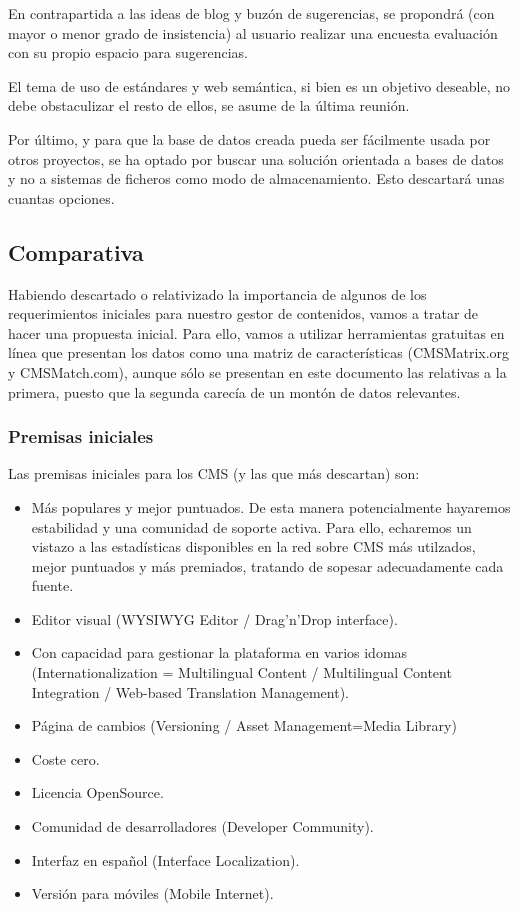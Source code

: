 \par En contrapartida a las ideas de blog y buzón de sugerencias, se propondrá (con mayor o menor grado de insistencia) al usuario realizar una encuesta evaluación con su propio espacio para sugerencias.

\par El tema de uso de estándares y web semántica, si bien es un objetivo deseable, no debe obstaculizar el resto de ellos, se asume de la última reunión.

\par Por último, y para que la base de datos creada pueda ser fácilmente usada por otros proyectos, se ha optado por buscar una solución orientada a bases de datos y no a sistemas de ficheros como modo de almacenamiento. Esto descartará unas cuantas opciones.

\subsection{Comparativa}

\par Habiendo descartado o relativizado la importancia de algunos de los requerimientos iniciales para nuestro gestor de contenidos, vamos a tratar de hacer una propuesta inicial. Para ello, vamos a utilizar herramientas gratuitas en línea que presentan los datos como una matriz de características (CMSMatrix.org y CMSMatch.com), aunque sólo se presentan en este documento las relativas a la primera, puesto que la segunda carecía de un montón de datos relevantes.

\subsubsection{Premisas iniciales}
\par Las premisas iniciales para los CMS (y las que más descartan) son:

\begin{itemize}
\item Más populares y mejor puntuados. De esta manera potencialmente hayaremos estabilidad y una comunidad de soporte activa. Para ello, echaremos un vistazo a las estadísticas disponibles en la red sobre CMS más utilzados, mejor puntuados y más premiados, tratando de sopesar adecuadamente cada fuente.
\item Editor visual (WYSIWYG Editor / Drag'n'Drop interface).
\item Con capacidad para gestionar la plataforma en varios idomas (Internationalization = Multilingual Content / Multilingual Content Integration / Web-based Translation Management).
\item Página de cambios (Versioning / Asset Management=Media Library)
\item Coste cero.
\item Licencia OpenSource.
\item Comunidad de desarrolladores (Developer Community).
\item Interfaz en español (Interface Localization).
\item Versión para móviles (Mobile Internet).
\end{itemize}


